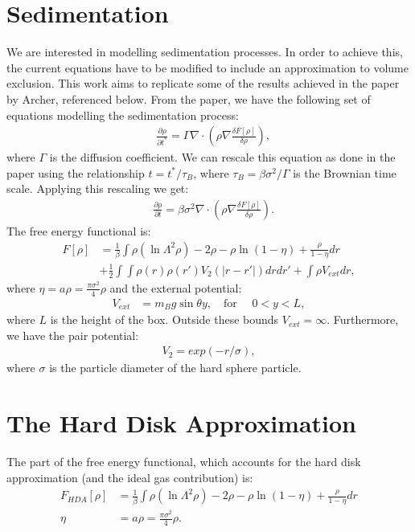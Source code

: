 \documentclass[11pt, a4paper]{article}
\theoremstyle{definition}
\begin{document}
\section*{Sedimentation}
	
We are interested in modelling sedimentation processes. In order to achieve this, the current equations have to be modified to include an approximation to volume exclusion. This work aims to replicate some of the results achieved in the paper by Archer, referenced below.
From the paper, we have the following set of equations modelling the sedimentation process:
\begin{align*}
	&\frac{\partial \rho}{\partial t^*} = \Gamma\nabla \cdot \left(  \rho \nabla \frac{\delta F[\rho]}{\delta \rho} \right) ,
\end{align*}
where $\Gamma$ is the diffusion coefficient. 	
We can rescale this equation as done in the paper using the relationship $t = t^*/ \tau_B$, where $\tau_B = \beta \sigma^2 / \Gamma$ is the Brownian time scale.
Applying this rescaling we get:
\begin{align}\label{Eq1}
	&\frac{\partial \rho}{\partial t} = \beta \sigma^2\nabla \cdot \left(  \rho \nabla \frac{\delta F[\rho]}{\delta \rho} \right).
\end{align}
The free energy functional is:
\begin{align*}
	F[\rho] &= \frac{1}{\beta} \int \rho (\ln \Lambda^2 \rho) - 2 \rho - \rho \ln(1 - \eta) + \frac{\rho}{1 - \eta} dr\\
	&+ \frac{1}{2}\int \int \rho(r) \rho(r') V_2(|r - r'|) dr dr' + \int \rho V_{ext} dr,
\end{align*}
where $\eta = a \rho = \frac{\pi \sigma^2}{4} \rho$ and the external potential:
\begin{align*}
	V_{ext} &= m_B g \sin \theta y, \quad \text{for } \quad 0 < y < L,
\end{align*}
where $L$ is the height of the box. Outside these bounds $V_{ext} = \infty$. 
Furthermore, we have the pair potential:
\begin{align*}
	V_2 = exp(-r/\sigma),
\end{align*}
where $\sigma$ is the particle diameter of the hard sphere particle.


\section{The Hard Disk Approximation}
The part of the free energy functional, which accounts for the hard disk approximation (and the ideal gas contribution) is:
\begin{align*}
	F_{HDA}[\rho] &= \frac{1}{\beta} \int \rho (\ln \Lambda^2 \rho) - 2 \rho - \rho \ln(1 - \eta) + \frac{\rho}{1 - \eta} dr\\
	\eta &= a \rho = \frac{\pi \sigma^2}{4} \rho.
\end{align*}
\end{document}
